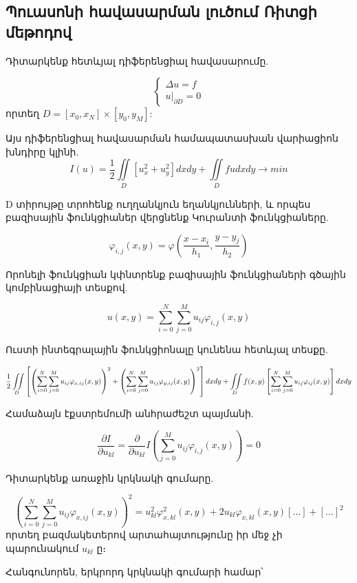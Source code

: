 \documentclass[fleqn, bachelor,subf,12pt,notitlepage]{disser}
\newcommand\scalemath[2]{\scalebox{#1}{\mbox{\ensuremath{\displaystyle #2}}}}
\begin{document}
\newpage
\subsection*{Պուասոնի հավասարման լուծում Ռիտցի մեթոդով}

Դիտարկենք հետևյալ դիֆերենցիալ հավասարումը.

				$$
					\begin{cases}
								\Delta u =f \\
								u \Big |_{\partial D} = 0
					\end{cases}
				$$
որտեղ $D = \left[x_{0}, x_{N}\right] \times \left[y_{0}, y_{M}\right]$:

Այս դիֆերենցիալ հավասարման  համապատասխան վարիացիոն խնդիրը կլինի.
			$$I(u) = \frac{1}{2}\iint \limits_{D} \left[u_x^2 + u_y^2 \right]dxdy + \iint \limits_{D} fudxdy \longrightarrow min$$

D տիրույթը տրոհենք ուղղանկյուն եղանկյունների, և որպես բազիսային ֆունկցիաներ վերցնենք Կուրանտի ֆունկցիաները.

					$$\varphi_{i,j}(x,y)=\varphi \left(\dfrac{x-x_{i}}{h_{1}}, \dfrac{y-y_{j}}{h_{2}}\right)$$

\noindent Որոնելի ֆունկցիան կփնտրենք բազիսային ֆունկցիաների գծային կոմբինացիայի տեսքով.

					$$u(x,y) = \sum_{i=0}^{N} \sum_{j=0}^{M} u_{ij}\varphi_{i, j}(x,y)$$

\noindent  Ուստի ինտեգրալային ֆունկցիոնալը կունենա հետևյալ տեսքը.

$$\scalemath{0.9}{\frac{1}{2} \iint \limits_{D}\left[\left(\sum_{i=0}^{N} \sum_{j=0}^{M}u_{ij}\varphi_{x, ij}(x,y)\right)^2 + \left(\sum_{i=0}^{N} \sum_{j=0}^{M}u_{ij}\varphi_{y, ij}(x,y)\right)^2 \right]dxdy + \iint \limits_{D}f(x,y)\left[ \sum_{i=0}^{N} \sum_{j=0}^{M}u_{ij}\varphi_{ij}(x,y)\right]dxdy}$$

\noindent  Համաձայն էքստրեմումի անհրաժեշտ պայմանի.

$$\dfrac{\partial I}{ \partial u_{kl}} = \dfrac{\partial}{\partial u_{kl}} I \left(\sum_{j=0}^{M} u_{ij}\varphi_{i, j}(x,y)\right) = 0 $$

\noindent Դիտարկենք առաջին կրկնակի գումարը.

				$$\left(\sum_{i=0}^{N} \sum_{j=0}^{M}u_{ij}\varphi_{x, ij}(x,y)\right)^2 = u_{kl}^2\varphi_{x, kl}^2(x,y) + 2u_{kl}\varphi_{x, kl}(x,y)[\dots] + [\dots]^2$$
\noindent որտեղ բազմակետերով արտահայտությունը իր մեջ չի պարունակում $u_{kl}$ ը։

\noindent Հանգունորեն, երկրորդ կրկնակի գումարի համար՝
\end{document}
